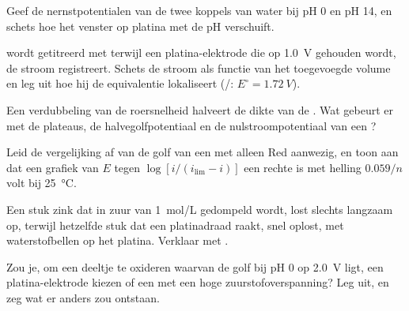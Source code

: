 \begin{exercise}[$\star\star$]\label{exo:b2:current-potential-curves:7}
Geef de nernstpotentialen van de twee koppels van water bij pH 0 en pH 14, en
schets hoe het venster op platina met de pH verschuift.
\end{exercise}

\begin{exercise}[$\star\star$]\label{exo:b2:current-potential-curves:8}
 wordt getitreerd met  terwijl een platina-elektrode die op
\qty{1.0}{V} gehouden wordt, de stroom registreert. Schets de stroom als functie van het toegevoegde volume
en leg uit hoe hij de equivalentie lokaliseert (/: $E^\circ =
\qty{1.72}{V}$).
\end{exercise}

\begin{exercise}[$\star\star$]\label{exo:b2:current-potential-curves:9}
Een verdubbeling van de roersnelheid halveert de dikte van de . Wat
gebeurt er met de plateaus, de halvegolfpotentiaal en de nulstroompotentiaal
van een ?
\end{exercise}

\begin{exercise}[$\star\star\star$]\label{exo:b2:current-potential-curves:10}
Leid de vergelijking af van de golf van een  met alleen Red aanwezig, en
toon aan dat een grafiek van $E$ tegen $\log[i/(i_{\lim} - i)]$ een rechte is met
helling $0.059/n$ volt bij \qty{25}{\degreeCelsius}.
\end{exercise}

\begin{exercise}[$\star\star\star$]\label{exo:b2:current-potential-curves:11}
Een stuk zink dat in zuur van \qty{1}{mol/L} gedompeld wordt, lost slechts langzaam op, terwijl
hetzelfde stuk dat een platinadraad raakt, snel oplost, met waterstofbellen
op het platina. Verklaar met .
\end{exercise}

\begin{exercise}[$\star\star\star$]\label{exo:b2:current-potential-curves:12}
Zou je, om een deeltje te oxideren waarvan de golf bij pH 0 op \qty{2.0}{V} ligt, een
platina-elektrode kiezen of een met een hoge zuurstofoverspanning? Leg uit, en zeg
wat er anders zou ontstaan.
\end{exercise}

